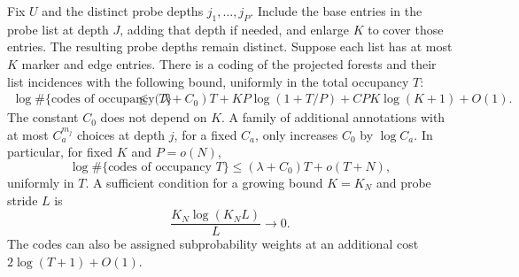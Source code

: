 \begin{lemma}\label{arm:address-codes}
Fix $U$ and the distinct probe depths $j_1,\ldots,j_P$.  Include the
base entries in the probe list at depth $J$, adding that depth if needed,
and enlarge $K$ to cover those entries.  The resulting probe depths
remain distinct.  Suppose each list has at most $K$ marker and edge entries.  There is a coding of the
projected forests and their list incidences with the following bound,
uniformly in the total occupancy $T$:
\begin{align}
 \log\#\{\text{codes of occupancy }T\}
 &\leq(\lambda+C_0)T
   +KP\log(1+T/P)
   +CPK\log(K+1)+O(1).\label{arm:address-code-count}
\end{align}
The constant $C_0$ does not depend on $K$.  A family of additional
annotations with at most $C_a^{m_j}$ choices at depth $j$, for a fixed
$C_a$, only increases $C_0$ by $\log C_a$.
In particular, for fixed $K$ and $P=o(N)$,
\begin{equation}\label{arm:address-code-leading}
 \log\#\{\text{codes of occupancy }T\}
 \leq(\lambda+C_0)T+o(T+N),
\end{equation}
uniformly in $T$.  A sufficient condition for a growing bound $K=K_N$
and probe stride $L$ is
\begin{equation}\label{arm:growing-list-condition}
 \frac{K_N\log(K_NL)}{L}\longrightarrow0.
\end{equation}
The codes can also be assigned subprobability weights at an additional
cost $2\log(T+1)+O(1)$.
\end{lemma}

